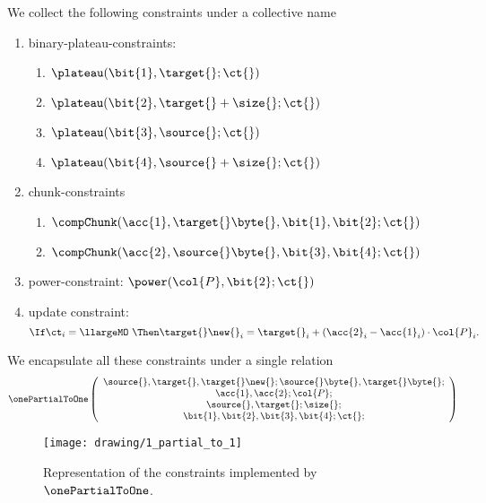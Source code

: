 We collect the following constraints under a collective name
\begin{enumerate}
	\item binary-plateau-constraints:
		\begin{enumerate}
			\item $\plateau(\bit{1}, \target{}\mark{}; \ct{})$
			\item $\plateau(\bit{2}, \target{}\mark{} + \size{}; \ct{})$
			\item $\plateau(\bit{3}, \source{}\mark{}; \ct{})$
			\item $\plateau(\bit{4}, \source{}\mark{} + \size{}; \ct{})$
		\end{enumerate}
	\item chunk-constraints
		\begin{enumerate}
			\item $\compChunk(\acc{1}, \target{}\byte{}, \bit{1}, \bit{2}; \ct{})$ %
			\item $\compChunk(\acc{2}, \source{}\byte{}, \bit{3}, \bit{4}; \ct{})$ %
		\end{enumerate}
	\item power-constraint: $\power(\col{P},\bit{2}; \ct{})$
	\item update constraint:
		\[
			\If
			\ct_i = \llargeMO~
			\Then
			\target{}\new{}_i
			=
			\target{}_i
			+
			(\acc{2}_i - \acc{1}_i)\cdot\col{P}_i.
		\]
\end{enumerate}
We encapsulate all these constraints under a single relation
\[
	\onePartialToOne
	\left( \begin{array}{c}
		\source{}, \target{}, \target{}\new{};
		\source{}\byte{}, \target{}\byte{};\\
		\acc{1}, \acc{2}; \col{P}; \\
		\source{}\mark{}, \target{}\mark{}; \size{};\\
		\bit{1}, \bit{2}, \bit{3}, \bit{4}; \ct{};
	\end{array} \right)
\]
\begin{figure}[h!]
	\centering
	\texttt{[image: drawing/1\_partial\_to\_1]}
	\label{fig: one partial to one}
	\caption{Representation of the constraints implemented by $\onePartialToOne$.}
\end{figure}
